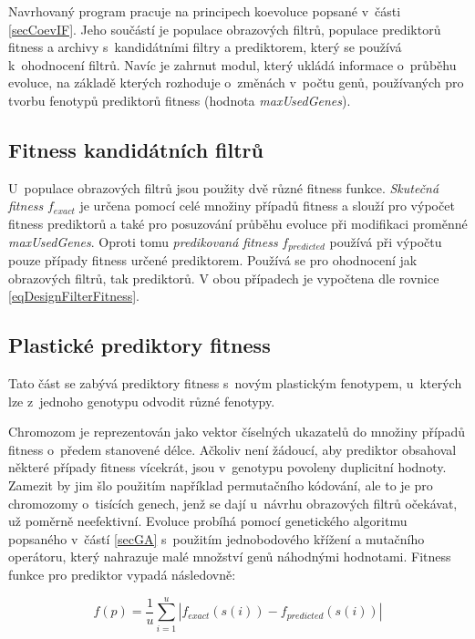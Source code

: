 Navrhovaný program pracuje na principech koevoluce popsané v~části \ref{secCoevIF}. Jeho součástí je populace obrazových filtrů, populace prediktorů fitness a archivy s~kandidátními filtry a prediktorem, který se používá k~ohodnocení filtrů. Navíc je zahrnut modul, který ukládá informace o~průběhu evoluce, na základě kterých rozhoduje o~změnách v~počtu genů, používaných pro tvorbu fenotypů prediktorů fitness (hodnota \emph{maxUsedGenes}).

\subsection{Fitness kandidátních filtrů}

U~populace obrazových filtrů jsou použity dvě různé fitness funkce. \emph{Skutečná fitness} $f_{\mathit{exact}}$ je určena pomocí celé množiny případů fitness a slouží pro výpočet fitness prediktorů a také pro posuzování průběhu evoluce při modifikaci proměnné \emph{maxUsedGenes}. Oproti tomu \emph{predikovaná fitness} $f_{\mathit{predicted}}$ používá při výpočtu pouze případy fitness určené prediktorem. Používá se pro ohodnocení jak obrazových filtrů, tak prediktorů. V obou případech je vypočtena dle rovnice \ref{eqDesignFilterFitness}.

\subsection{Plastické prediktory fitness}
\label{secDesignPred}

Tato část se zabývá prediktory fitness s~novým plastickým fenotypem, u~kterých lze z~jednoho genotypu  odvodit různé fenotypy.

Chromozom je reprezentován jako vektor číselných ukazatelů do množiny případů fitness o~předem stanovené délce. Ačkoliv není žádoucí, aby prediktor obsahoval některé případy fitness vícekrát, jsou v~genotypu povoleny duplicitní hodnoty. Zamezit by jim šlo použitím například permutačního kódování, ale to je pro chromozomy o~tisících genech, jenž se dají u~návrhu obrazových filtrů očekávat, už poměrně neefektivní. Evoluce probíhá pomocí genetického algoritmu popsaného v~částí \ref{secGA} s~použitím jednobodového křížení a mutačního operátoru, který nahrazuje malé množství genů náhodnými hodnotami. Fitness funkce pro prediktor vypadá následovně:

\begin{equation}
    \label{eqDesignPredFitness}
    f \left( p \right) = \frac{1}{u} \sum\limits_{i=1}^{u} \left| f_{\mathit{exact}} \left( s \left( i \right) \right) - f_{\mathit{predicted}} \left( s \left( i \right) \right) \right|
\end{equation}

